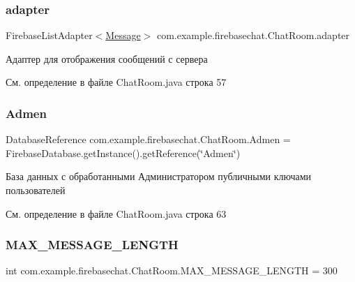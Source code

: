 \subsubsection{\texorpdfstring{adapter}{adapter}}
{\footnotesize\ttfamily Firebase\+List\+Adapter$<$\mbox{\hyperlink{classcom_1_1example_1_1firebasechat_1_1_message}{Message}}$>$ com.\+example.\+firebasechat.\+Chat\+Room.\+adapter}



Адаптер для отображения сообщений с сервера 



См. определение в файле Chat\+Room.\+java строка 57

\mbox{\label{classcom_1_1example_1_1firebasechat_1_1_chat_room_af6807d5446ac002a074f0ad11724ce71}} 
\subsubsection{\texorpdfstring{Admen}{Admen}}
{\footnotesize\ttfamily Database\+Reference com.\+example.\+firebasechat.\+Chat\+Room.\+Admen = Firebase\+Database.\+get\+Instance().get\+Reference(\char`\"{}Admen\char`\"{})}



База данных с обработанными Администратором публичными ключами пользователей 



См. определение в файле Chat\+Room.\+java строка 63

\mbox{\label{classcom_1_1example_1_1firebasechat_1_1_chat_room_a16b9729a48a21196941e042b2768cb26}} 
\subsubsection{\texorpdfstring{M\+A\+X\+\_\+\+M\+E\+S\+S\+A\+G\+E\+\_\+\+L\+E\+N\+G\+TH}{MAX\_MESSAGE\_LENGTH}}
{\footnotesize\ttfamily int com.\+example.\+firebasechat.\+Chat\+Room.\+M\+A\+X\+\_\+\+M\+E\+S\+S\+A\+G\+E\+\_\+\+L\+E\+N\+G\+TH = 300\hspace{0.3cm}{\ttfamily [static]}}



